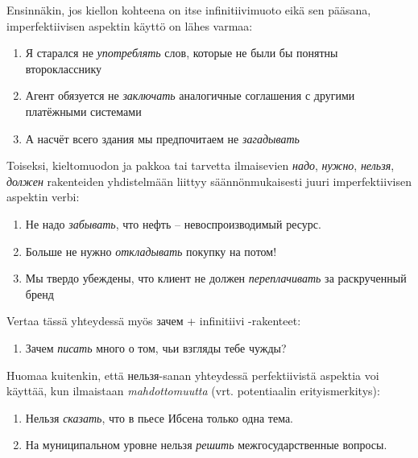 \documentclass[]{scrartcl}
\providecommand{\tightlist}{%
  \setlength{\itemsep}{0pt}\setlength{\parskip}{0pt}}
\begin{document}
Ensinnäkin, jos kiellon kohteena on itse infinitiivimuoto eikä sen
pääsana, imperfektiivisen aspektin käyttö on lähes varmaa:

\begin{enumerate}
\def\labelenumi{(\arabic{enumi})}
\setcounter{enumi}{324}
\tightlist
\item
  Я старался не \emph{употреблять} слов, которые не были бы понятны
  второкласснику
\item
  Агент обязуется не \emph{заключать} аналогичные соглашения с другими
  платёжными системами
\item
  А насчёт всего здания мы предпочитаем не \emph{загадывать}
\end{enumerate}

Toiseksi, kieltomuodon ja pakkoa tai tarvetta ilmaisevien \emph{надо},
\emph{нужно}, \emph{нельзя}, \emph{должен} rakenteiden yhdistelmään
liittyy säännönmukaisesti juuri imperfektiivisen aspektin verbi:

\begin{enumerate}
\def\labelenumi{(\arabic{enumi})}
\setcounter{enumi}{327}
\tightlist
\item
  Не надо \emph{забывать}, что нефть -- невоспроизводимый ресурс.
\item
  Больше не нужно \emph{откладывать} покупку на потом!
\item
  Мы твердо убеждены, что клиент не должен \emph{переплачивать} за
  раскрученный бренд
\end{enumerate}

Vertaa tässä yhteydessä myös зачем + infinitiivi -rakenteet:

\begin{enumerate}
\def\labelenumi{(\arabic{enumi})}
\setcounter{enumi}{330}
\tightlist
\item
  Зачем \emph{писать} много о том, чьи взгляды тебе чужды?
\end{enumerate}

Huomaa kuitenkin, että нельзя-sanan yhteydessä perfektiivistä aspektia
voi käyttää, kun ilmaistaan \emph{mahdottomuutta} (vrt. potentiaalin
erityismerkitys):

\begin{enumerate}
\def\labelenumi{(\arabic{enumi})}
\setcounter{enumi}{331}
\tightlist
\item
  Нельзя \emph{сказать}, что в пьесе Ибсена только одна тема.
\item
  На муниципальном уровне нельзя \emph{решить} межгосударственные
  вопросы.
\end{enumerate}
\end{document}
